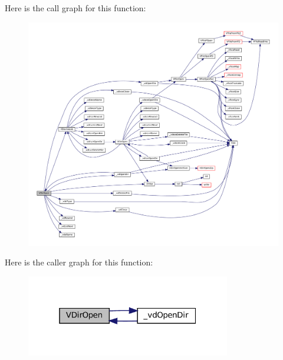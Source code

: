 Here is the call graph for this function\+:
\nopagebreak
\begin{figure}[H]
\begin{center}
\leavevmode
\includegraphics[width=350pt]{vfs-dirent_8c_a2966065604f0fcfa278b5246d4d653b9_cgraph}
\end{center}
\end{figure}
Here is the caller graph for this function\+:
\nopagebreak
\begin{figure}[H]
\begin{center}
\leavevmode
\includegraphics[width=253pt]{vfs-dirent_8c_a2966065604f0fcfa278b5246d4d653b9_icgraph}
\end{center}
\end{figure}
